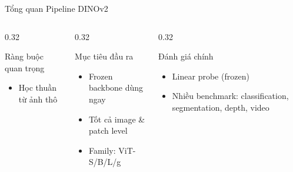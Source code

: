 \documentclass[aspectratio=169]{beamer}
\begin{document}
\begin{frame}[t,shrink=15]{Tổng quan Pipeline DINOv2}
\begin{columns}[t]
\begin{column}{0.32\textwidth}
\begin{alertblock}{Ràng buộc quan trọng}
\begin{itemize}
                    \item Học thuần từ ảnh thô
                \end{itemize}
            \end{alertblock}
        \end{column}
        \begin{column}{0.32\textwidth}
            \begin{block}{Mục tiêu đầu ra}
                \begin{itemize}
                    \item Frozen backbone dùng ngay
                    \item Tốt cả image \& patch level
                    \item Family: ViT-S/B/L/g
                \end{itemize}
            \end{block}
        \end{column}
        \begin{column}{0.32\textwidth}
            \begin{exampleblock}{Đánh giá chính}
                \begin{itemize}
                    \item Linear probe (frozen)
                    \item Nhiều benchmark: classification, segmentation, depth, video
                \end{itemize}
            \end{exampleblock}
        \end{column}
    \end{columns}
\end{frame}
\end{document}
